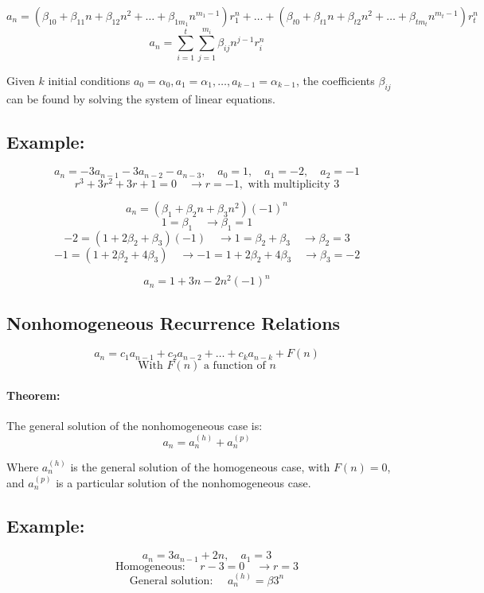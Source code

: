 \documentclass[11pt]{article}
\begin{document}
\[
a_n = (\beta_{10} + \beta_{11} n + \beta_{12} n^2 + \dots + \beta_{1m_1} n^{m_1-1}) r_1^n + \dots + (\beta_{t0} + \beta_{t1} n + \beta_{t2} n^2 + \dots + \beta_{tm_t} n^{m_t-1}) r_t^n
\]
\[
a_n = \sum_{i=1}^{t} \sum_{j=1}^{m_i} \beta_{ij} n^{j-1} r_i^n
\]

Given $k$ initial conditions $a_0 = \alpha_0, a_1 = \alpha_1, \dots, a_{k-1} = \alpha_{k-1}$, the coefficients $\beta_{ij}$ can be found by solving the system of linear equations.

\subsection*{Example:}
\[
a_n = -3 a_{n-1} - 3 a_{n-2} - a_{n-3}, \quad a_0 = 1, \quad a_1 = -2, \quad a_2 = -1
\]
\[
r^3 + 3r^2 + 3r + 1 = 0 \quad \rightarrow r = -1, \text{ with multiplicity } 3
\]

\[
a_n = (\beta_1 + \beta_2 n + \beta_3 n^2) (-1)^n
\]
\[
1 = \beta_1 \quad \rightarrow \beta_1 = 1
\]
\[
-2 = (1 + 2 \beta_2 + \beta_3) (-1) \quad \rightarrow 1 = \beta_2 + \beta_3 \quad \rightarrow \beta_2 = 3
\]
\[
-1 = (1 + 2 \beta_2 + 4 \beta_3) \quad \rightarrow -1 = 1 + 2 \beta_2 + 4 \beta_3 \quad \rightarrow \beta_3 = -2
\]

\[
a_n = 1 + 3n - 2n^2 (-1)^n
\]

\subsection{Nonhomogeneous Recurrence Relations}
\[
a_n = c_1 a_{n-1} + c_2 a_{n-2} + \dots + c_k a_{n-k} + F(n)
\]
\[
\text{With } F(n) \text{ a function of } n
\]

\paragraph{Theorem:}
The general solution of the nonhomogeneous case is:
\[
a_n = a_n^{(h)} + a_n^{(p)}
\]

Where $a_n^{(h)}$ is the general solution of the homogeneous case, with $F(n) = 0$, and $a_n^{(p)}$ is a particular solution of the nonhomogeneous case.

\subsection*{Example:}
\[
a_n = 3 a_{n-1} + 2n, \quad a_1 = 3
\]
\[
\text{Homogeneous: } \quad r - 3 = 0 \quad \rightarrow r = 3
\]
\[
\text{General solution: } \quad a_n^{(h)} = \beta 3^n
\]
\end{document}
